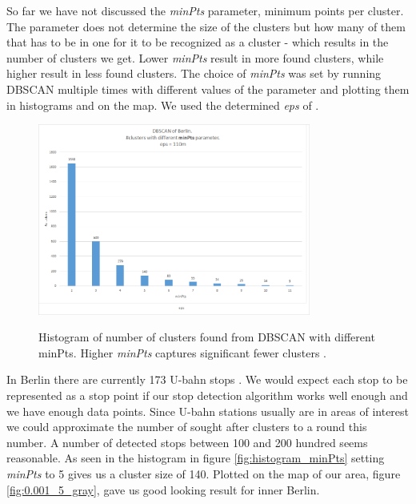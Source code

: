 So far we have not discussed the \textit{minPts} parameter, minimum points per cluster. The parameter does not determine the size of the clusters but how many of them that has to be in one for it to be recognized as a cluster - which results in the number of clusters we get. Lower \textit{minPts} result in more found clusters, while higher result in less found clusters. The choice of \textit{minPts} was set by running DBSCAN multiple times with different values of the parameter and plotting them in histograms and on the map. We used the determined \textit{eps} of . 
\begin{figure}[!ht]
	\centering
	\includegraphics[width=0.8\textwidth]{images/histogram_minPts}\\
	\caption{ Histogram of number of clusters found from DBSCAN with different minPts. Higher \textit{minPts} captures significant fewer clusters . }
	\label{fig:histogram_minPts}
\end{figure}
In Berlin there are currently 173 U-bahn stops \cite{sbahn}. We would expect each stop to be represented as a stop point if our stop detection algorithm works well enough and we have enough data points. Since U-bahn stations usually are in areas of interest we could approximate the number of sought after clusters to a round this number. A number of detected stops between 100 and 200 hundred seems reasonable. As seen in the histogram in figure \autoref{fig:histogram_minPts} setting \textit{minPts} to 5 gives us a cluster size of 140. Plotted on the map of our area, figure \autoref{fig:0.001_5_gray}, gave us good looking result for inner Berlin. 


